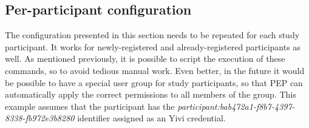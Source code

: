 \documentclass{report}
\begin{document}
\subsection{Per-participant configuration}
The configuration presented in this section needs to be repeated for each study participant. It works for newly-registered and already-registered participants as well. As
mentioned previously, it is possible to script the execution of these commands, so to avoid tedious manual work. Even better, in the future it would be possible to have a special
user group for study participants, so that PEP can automatically apply the correct permissions to all members of the group. This example assumes that the participant has the
\textit{participant:bab472a1-f8b7-4397-8338-fb972e3b8280} identifier assigned as an Yivi credential. 
\end{document}
